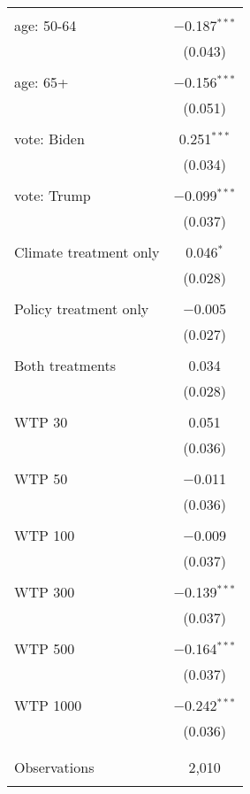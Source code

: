\begin{tabular}{@{\extracolsep{5pt}}lc}
  & \\ 
 age: 50-64 & $-$0.187$^{***}$ \\ 
  & (0.043) \\ 
  & \\ 
 age: 65+ & $-$0.156$^{***}$ \\ 
  & (0.051) \\ 
  & \\ 
 vote: Biden & 0.251$^{***}$ \\ 
  & (0.034) \\ 
  & \\ 
 vote: Trump & $-$0.099$^{***}$ \\ 
  & (0.037) \\ 
  & \\ 
 Climate treatment only & 0.046$^{*}$ \\ 
  & (0.028) \\ 
  & \\ 
 Policy treatment only & $-$0.005 \\ 
  & (0.027) \\ 
  & \\ 
 Both treatments & 0.034 \\ 
  & (0.028) \\ 
  & \\ 
 WTP 30 & 0.051 \\ 
  & (0.036) \\ 
  & \\ 
 WTP 50 & $-$0.011 \\ 
  & (0.036) \\ 
  & \\ 
 WTP 100 & $-$0.009 \\ 
  & (0.037) \\ 
  & \\ 
 WTP 300 & $-$0.139$^{***}$ \\ 
  & (0.037) \\ 
  & \\ 
 WTP 500 & $-$0.164$^{***}$ \\ 
  & (0.037) \\ 
  & \\ 
 WTP 1000 & $-$0.242$^{***}$ \\ 
  & (0.036) \\ 
  & \\ 
\hline \\[-1.8ex] 

Observations & 2,010 \\ 
\hline 
\hline \\[-1.8ex] 
\end{tabular} 
